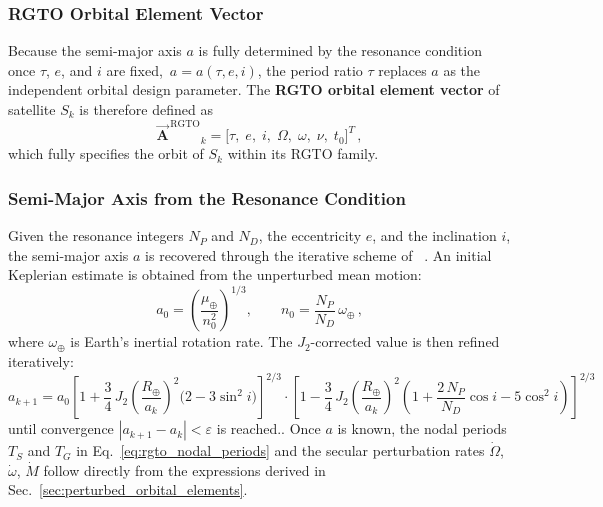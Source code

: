 \subsubsection{RGTO Orbital Element Vector}
\label{sec:rgto_element_vector_def}

Because the semi-major axis $a$ is fully determined by the resonance condition once $\tau$, $e$, and $i$ are fixed,\ $a = a(\tau, e, i)$,  the period ratio $\tau$ replaces $a$ as the independent orbital design parameter.  The \textbf{RGTO orbital element vector} of satellite $S_k$ is therefore defined as
\begin{equation}
    \vec{\mathbf{A}}^{\,\mathrm{RGTO}}{}_{k} = \bigl[\tau,\; e,\; i,\; \Omega,\; \omega,\; \nu,\; t_0\bigr]^{T}\,,
    \label{eq:rgto_element_vector}
\end{equation}
which fully specifies the orbit of $S_k$ within its RGTO family.

\subsubsection{Semi-Major Axis from the Resonance Condition}
\label{sec:rgto_sma_iteration}

Given the resonance integers $N_P$ and $N_D$, the eccentricity $e$, and the inclination $i$, the semi-major axis $a$ is recovered through the iterative scheme of \citeauthor{ulybyshevSatelliteConstellationDesign2008}~\cite{ulybyshevSatelliteConstellationDesign2008}.  An initial Keplerian estimate is obtained from the unperturbed mean motion:
\begin{equation}
    a_0 = \left(\frac{\mu_{\oplus}}{n_0^{2}}\right)^{1/3}, \qquad
    n_0 = \frac{N_P}{N_D}\,\omega_{\oplus}\,,
    \label{eq:rgto_a0_guess}
\end{equation}
where $\omega_{\oplus}$ is Earth's inertial rotation rate.  The $J_2$-corrected value is then refined iteratively:
\begin{equation}
    a_{k+1} = a_0
    \left[1 + \frac{3}{4}\,J_2\!\left(\frac{R_{\oplus}}{a_k}\right)^{\!2}
          \bigl(2 - 3\sin^{2} i\bigr)\right]^{2/3}
    \!\cdot\!
    \left[1 - \frac{3}{4}\,J_2\!\left(\frac{R_{\oplus}}{a_k}\right)^{\!2}
          \!\left(1 + \frac{2\,N_P}{N_D}\cos i - 5\cos^{2} i\right)\right]^{2/3}
    \label{eq:rgto_sma_iteration}
\end{equation}
until convergence $|a_{k+1} - a_k| < \varepsilon$ is reached..  Once $a$ is known, the nodal periods $T_S$ and $T_G$ in Eq.~\eqref{eq:rgto_nodal_periods} and the secular perturbation rates $\dot{\Omega}$, $\dot{\omega}$, $\dot{M}$ follow directly from the expressions derived in Sec.~\ref{sec:perturbed_orbital_elements}.



